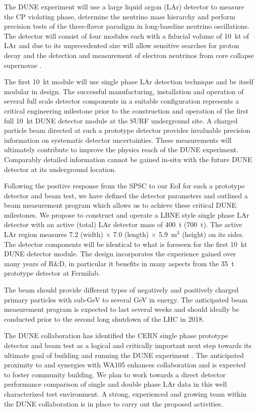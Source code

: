 \vspace{0.5cm}
The DUNE experiment will use a large liquid argon (LAr) detector to measure the CP violating phase, determine the neutrino mass hierarchy and perform precision tests of the three-flavor paradigm in long-baseline neutrino oscillations. The detector will consist of four modules 
each with a fiducial volume of 10~kt of LAr and due to its unprecedented size will allow sensitive searches for proton decay and the detection and measurement of electron neutrinos from core collapse supernovae \cite{dunecdr}.

The first 10~kt module will use single phase LAr detection technique and be itself modular in design. The successful manufacturing, installation and operation of several full scale detector components in a suitable configuration represents a critical engineering milestone prior to the construction and operation of the first full 10~kt DUNE detector module at the SURF underground site. A charged particle beam directed at such a prototype detector provides invaluable precision information on systematic detector uncertainties. These measurements will ultimately
contribute to improve the physics reach of the DUNE experiment. Comparably detailed information cannot be gained in-situ with the future DUNE detector at its underground location.

Following the positive response from the SPSC to our EoI \cite{eoi} for such a prototype detector and beam test, we have defined the detector parameters and outlined a beam measurement program which allows us to achieve these critical DUNE milestones.
%
We propose to construct and operate a LBNE style single phase LAr detector with an active (total) LAr detector mass of 400~t (700~t). 
The active LAr region measures 7.2 (width) $\times$ 7.0 (length) $\times$ 5.9~m$^3$ (height) on its sides.
The detector components will be identical to what is foreseen for the first 10~kt DUNE detector module. The design incorporates the
experience gained over many years of R\&D, in particular it benefits in many aspects from the 35~t prototype detector at Fermilab.

The beam should provide different types of negatively and positively charged primary particles with 
sub-GeV to several GeV in energy.
The anticipated beam measurement program
is expected to last several weeks and should ideally be conducted prior to the second 
long shutdown of the LHC in 2018. 

The DUNE collaboration has identified the CERN single phase prototype detector and beam test as a logical and critically important next
step towards its ultimate goal of building and running the DUNE experiment \cite{dunecdr}. The anticipated proximity to and synergies with WA105 enhances collaboration and is expected to foster community building. We plan to work towards a direct detector performance comparison of single and double phase LAr data in this well characterized test environment. 
%
A strong, experienced and growing team within the DUNE collaboration is in place to carry out the proposed activities.











